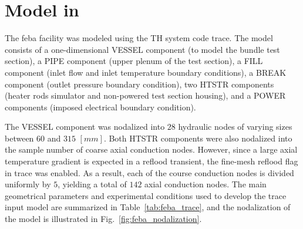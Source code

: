 \section{ Model in }\label{sec:reflood_feba_trace}

The \gls{feba} facility was modeled using the TH system code \gls{trace}.
The model consists of a one-dimensional \textsc{VESSEL} component (to model the bundle test section),
a \textsc{PIPE} component (upper plenum of the test section), 
a \textsc{FILL} component (inlet flow and inlet temperature boundary conditions),
a \textsc{BREAK} component (outlet pressure boundary condition),
two \textsc{HTSTR} components (heater rods simulator and non-powered test section housing),
and a \textsc{POWER} components (imposed electrical boundary condition).

The \textsc{VESSEL} component was nodalized into $28$ hydraulic nodes of varying sizes between $60$ and $315$ $[mm]$.
Both \textsc{HTSTR} components were also nodalized into the sample number of coarse axial conduction nodes.
However, since a large axial temperature gradient is expected in a reflood transient,
the fine-mesh reflood flag in \gls{trace} was enabled.
As a result, each of the course conduction nodes is divided uniformly by $5$,
yielding a total of $142$ axial conduction nodes.
The main geometrical parameters and experimental conditions used to develop the \gls{trace} input model
are summarized in Table~\ref{tab:feba_trace},
and the nodalization of the model is illustrated in Fig.~\ref{fig:feba_nodalization}.

